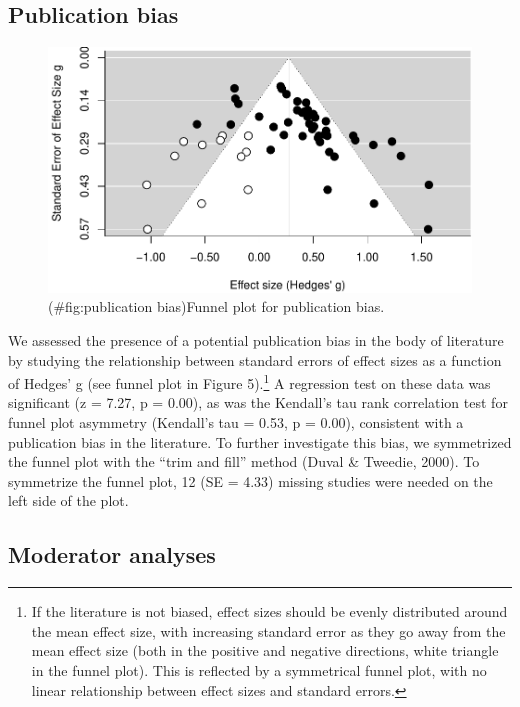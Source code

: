 \documentclass[man]{apa6}
\let\rmarkdownfootnote\footnote%
\def\footnote{\protect\rmarkdownfootnote}
\begin{document}
\subsection{Publication bias}\label{publication-bias}

\begin{figure}
\centering
\includegraphics{MA_speech_pref_files/figure-latex/publication bias-1.pdf}
\caption{(\#fig:publication bias)Funnel plot for publication bias.}
\end{figure}

We assessed the presence of a potential publication bias in the body of
literature by studying the relationship between standard errors of
effect sizes as a function of Hedges' g (see funnel plot in Figure
5).\footnote{If the literature is not biased, effect sizes should be
  evenly distributed around the mean effect size, with increasing
  standard error as they go away from the mean effect size (both in the
  positive and negative directions, white triangle in the funnel plot).
  This is reflected by a symmetrical funnel plot, with no linear
  relationship between effect sizes and standard errors.} A regression
test on these data was significant (z = 7.27, p = 0.00), as was the
Kendall's tau rank correlation test for funnel plot asymmetry (Kendall's
tau = 0.53, p = 0.00), consistent with a publication bias in the
literature. To further investigate this bias, we symmetrized the funnel
plot with the \enquote{trim and fill} method (Duval \& Tweedie, 2000).
To symmetrize the funnel plot, 12 (SE = 4.33) missing studies were
needed on the left side of the plot.

\subsection{Moderator analyses}\label{moderator-analyses}
\end{document}
